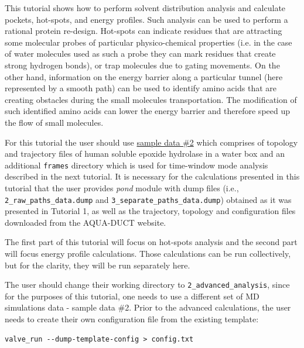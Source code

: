 \documentclass[9pt,tutorial]{livecoms}
\begin{document}
This tutorial shows how to perform solvent distribution analysis and calculate pockets, hot-spots, and energy profiles. Such analysis can be used to perform a rational protein re-design. Hot-spots can indicate residues that are attracting some molecular probes of particular physico-chemical properties (i.e. in the case of water molecules used as such a probe they can mark residues that create strong hydrogen bonds), or trap molecules due to gating movements. On the other hand, information on the energy barrier along a particular tunnel (here represented by a smooth path) can be used to identify amino acids that are creating obstacles during the small molecules transportation. The modification of such identified amino acids can lower the energy barrier and therefore speed up the flow of small molecules.

For this tutorial the user should use \href{http://www.aquaduct.pl/user-guide/}{sample data \#2} which comprises of topology and trajectory files of human soluble epoxide hydrolase in a water box and an additional \texttt{frames} directory which is used for time-window mode analysis described in the next tutorial. It is necessary for the calculations presented in this tutorial that the user provides \textit{pond} module with dump files (i.e., \texttt{2\_raw\_paths\_data.dump} and \texttt{3\_separate\_paths\_data.dump}) obtained as it was presented in Tutorial 1, as well as the trajectory, topology and configuration files downloaded from the AQUA-DUCT website.

The first part of this tutorial will focus on hot-spots analysis and the second part will focus energy profile calculations. Those calculations can be run collectively, but for the clarity, they will be run separately here.

The user should change their working directory to \texttt{2\_advanced\_analysis}, since for the purposes of this tutorial, one needs to use a different set of MD simulations data - sample data \#2. Prior to the advanced calculations, the user needs to create their own configuration file from the existing template:
\begin{lstlisting}
valve_run --dump-template-config > config.txt
\end{lstlisting}
\end{document}
